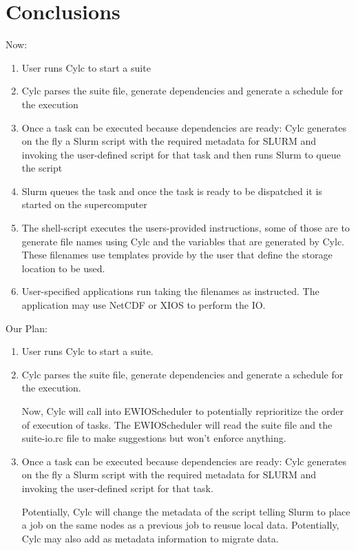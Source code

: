 \documentclass[a4paper]{article}
\begin{document}
{{{{}}

\section{Conclusions}
\label{sec:conclusions}

Now:
\begin{enumerate}
  \item User runs Cylc to start a suite
  \item Cylc parses the suite file, generate dependencies and generate a schedule for the execution
  \item Once a task can be executed because dependencies are ready: Cylc generates on the fly a Slurm script with the required metadata for SLURM and invoking the user-defined script for that task and then runs Slurm to queue the script
  \item Slurm queues the task and once the task is ready to be dispatched it is started on the supercomputer
  \item The shell-script executes the users-provided instructions, some of those are to generate file names using Cylc and the variables that are generated by Cylc. These filenames use templates provide by the user that define the storage location to be used.
  \item User-specified applications run taking the filenames as instructed.
  The application may use NetCDF or XIOS to perform the IO.

\end{enumerate}

Our Plan:

\begin{enumerate}
  \item User runs Cylc to start a suite.
  \item Cylc parses the suite file, generate dependencies and generate a schedule for the execution.

  Now, Cylc will call into EWIOScheduler to potentially reprioritize the order of execution of tasks.
  The EWIOScheduler will read the suite file and the suite-io.rc file to make suggestions but won't enforce anything.

  \item Once a task can be executed because dependencies are ready: Cylc generates on the fly a Slurm script with the required metadata for SLURM and invoking the user-defined script for that task.

  Potentially, Cylc will change the metadata of the script telling Slurm to place a job on the same nodes as a previous job to reusue local data.
  Potentially, Cylc may also add as metadata information to migrate data.


\end{enumerate}}}
\end{document}
